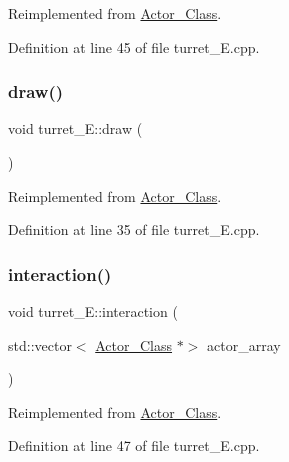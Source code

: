 Reimplemented from \hyperlink{class_actor___class_a9447c6154a674d7e6bdf24ff2874b7a8}{Actor\+\_\+\+Class}.



Definition at line 45 of file turret\+\_\+\+E.\+cpp.

\hypertarget{classturret___e_a55fc34335f9afb92a126da741a82f62a}{}\label{classturret___e_a55fc34335f9afb92a126da741a82f62a} 
\subsubsection{\texorpdfstring{draw()}{draw()}}
{\footnotesize\ttfamily void turret\+\_\+\+E\+::draw (\begin{DoxyParamCaption}{ }\end{DoxyParamCaption})\hspace{0.3cm}{\ttfamily [virtual]}}



Reimplemented from \hyperlink{class_actor___class_ac49cd62be76b4b950ecbe155413f1b64}{Actor\+\_\+\+Class}.



Definition at line 35 of file turret\+\_\+\+E.\+cpp.

\hypertarget{classturret___e_a34cfbe8887180d443eca15fd71370964}{}\label{classturret___e_a34cfbe8887180d443eca15fd71370964} 
\subsubsection{\texorpdfstring{interaction()}{interaction()}}
{\footnotesize\ttfamily void turret\+\_\+\+E\+::interaction (\begin{DoxyParamCaption}\item[{std\+::vector$<$ \hyperlink{class_actor___class}{Actor\+\_\+\+Class} $\ast$$>$}]{actor\+\_\+array }\end{DoxyParamCaption})\hspace{0.3cm}{\ttfamily [virtual]}}



Reimplemented from \hyperlink{class_actor___class_a87d1e079d8576fa99592a60b38a04a1b}{Actor\+\_\+\+Class}.



Definition at line 47 of file turret\+\_\+\+E.\+cpp.

\hypertarget{classturret___e_a74827456c32525695ee09d5577c55fd4}{}\label{classturret___e_a74827456c32525695ee09d5577c55fd4} 
